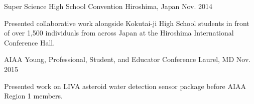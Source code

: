 \begin{cventries}
  \modifiedPresentation
    {}
    {Super Science High School Convention}
    {Hiroshima, Japan}
    {Nov. 2014}
    {
      \begin{cvitems}
        \item {Presented collaborative work alongside Kokutai-ji High School students in front of over 1,500 individuals from across Japan at the Hiroshima International Conference Hall.}
      \end{cvitems}
    }
  \modifiedPresentation
    {}
    {AIAA Young, Professional, Student, and Educator Conference}
    {Laurel, MD}
    {Nov. 2015}
    {
      \begin{cvitems}
        \item {Presented work on LIVA asteroid water detection sensor package before AIAA Region 1 members.}
      \end{cvitems}
    }
\end{cventries}
